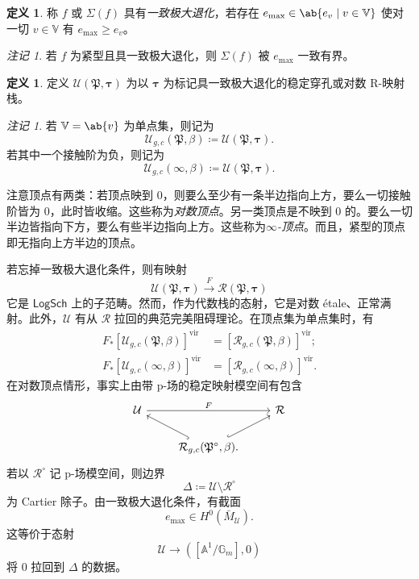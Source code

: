 \documentclass{amsart}
\theoremstyle{definition}
\newtheorem{defn}[thm]{定义}
\theoremstyle{remark}
\newtheorem{rmk}[thm]{注记}
\theoremstyle{plain}
\theoremstyle{definition}
\theoremstyle{remark}
\newcommand{\A}{\mathbb{A}}
\newcommand{\G}{\mathbb{G}}
\newcommand{\V}{\mathbb{V}}
\newcommand{\mc}[1]{\mathcal{#1}}
\newcommand{\mf}[1]{\mathfrak{#1}}
\newcommand{\mr}[1]{\mathrm{#1}}
\newcommand{\ms}[1]{\mathsf{#1}}
\newcommand{\1}{\mathbf{1}}
\newcommand{\2}{\mathbf{2}}
\newcommand{\3}{\mathbf{3}}
\newcommand{\vir}{\mr{vir}}
\begin{document}
\begin{defn}
    称 \(f\) 或 \(\Sigma(f)\) 具有\textit{一致极大退化}，若存在 \(e_{\max} \in \ab\{e_v \mid v \in \V \}\) 使对一切 \(v \in \V\) 有 \(e_{\max} \geq e_v\)。
\end{defn}

\begin{rmk}
    若 \(f\) 为紧型且具一致极大退化，则 \(\Sigma(f)\) 被 \(e_{\max}\) 一致有界。
\end{rmk}

\begin{defn}
    定义 \(\mc{U}(\mf{P}, \bm{\tau})\) 为以 \(\bm{\tau}\) 为标记具一致极大退化的稳定穿孔或对数 R-映射栈。
\end{defn}

\begin{rmk}
    若 \(\V = \ab\{v\}\) 为单点集，则记为
    \[ \mc{U}_{g, c}(\mf{P}, \beta) \coloneqq \mc{U}(\mf{P}, \bm{\tau}). \]
    若其中一个接触阶为负，则记为
    \[ \mc{U}_{g, c}(\infty, \beta) \coloneqq \mc{U}(\mf{P}, \bm{\tau}). \]
\end{rmk}

注意顶点有两类：若顶点映到 \(0\)，则要么至少有一条半边指向上方，要么一切接触阶皆为 \(0\)，此时皆收缩。这些称为\textit{对数顶点}。另一类顶点是不映到 \(0\) 的。要么一切半边皆指向下方，要么有些半边指向上方。这些称为\textit{\(\infty\)-顶点}。而且，紧型的顶点即无指向上方半边的顶点。

若忘掉一致极大退化条件，则有映射
\[ \mc{U}(\mf{P}, \bm{\tau}) \xrightarrow{F} \mc{R}(\mf{P}, \bm{\tau}) \]
它是 \(\ms{LogSch}\) 上的子范畴。然而，作为代数栈的态射，它是对数 \'etale、正常满射。此外，\(\mc{U}\) 有从 \(\mc{R}\) 拉回的典范完美阻碍理论。在顶点集为单点集时，有
\begin{align*}
    F_* [\mc{U}_{g, c}(\mf{P}, \beta)]^{\vir} &= [\mc{R}_{g, c}(\mf{P}, \beta)]^{\vir}; \\
    F_* [\mc{U}_{g, c}(\infty, \beta)]^{\vir} &= [\mc{R}_{g, c}(\infty, \beta)]^{\vir}.
\end{align*}
在对数顶点情形，事实上由带 p-场的稳定映射模空间有包含
\begin{equation*}
\begin{tikzcd}
    \mc{U} \ar{rr}{F} & & \mc{R} \\
    & \mc{R}_{g,c}(\mf{P}^{\circ}, \beta) \ar[hookrightarrow]{ul} \ar[hookrightarrow]{ur}.
\end{tikzcd}
\end{equation*}
若以 \(\mc{R}^{\circ}\) 记 p-场模空间，则边界
\[ \Delta \coloneqq \mc{U} \setminus \mc{R}^{\circ} \]
为 Cartier 除子。由一致极大退化条件，有截面
\[ e_{\max} \in H^0(\bar{M}_{\mc{U}}). \]
这等价于态射
\[ \mc{U} \to ([\A^1/\G_m], 0) \]
将 \(0\) 拉回到 \(\Delta\) 的数据。
\end{document}
